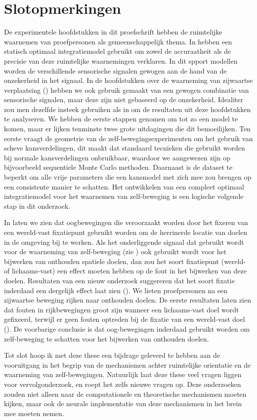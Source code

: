 \section{Slotopmerkingen}
De experimentele hoofdstukken in dit proefschrift hebben de ruimtelijke waarnemen van proefpersonen als gemeenschappelijk thema. In  hebben een statisch optimaal integratiemodel gebruikt om zowel de accuraatheit als de precisie van deze ruimtelijke waarnemingen verklaren. In dit spport modellen worden de verschillende sensorische signalen gewogen aan de hand van de onzekerheid in het signaal. In de hoofdstukken over de waarneming van zijwaartse verplaatsing () hebben we ook gebruik gemaakt van een gewogen combinatie van sensorische signalen, maar deze zijn niet gebaseerd op de onzekerheid. Idealiter zou men dezelfde insteek gebruiken als in  om de resultaten uit deze hoofdstukken te analyseren. We hebben de eerste stappen genomen om tot zo een model te komen, maar er lijken tenminste twee grote uitdagingen die dit bemoeilijken. Ten eerste vraagt de geometrie van de zelf-bewegingsexperimenten om het gebruik van scheve kansverdelingen, dit maakt dat standaard tecnieken die gebruikt worden bij normale kansverdelingen onbruikbaar, waardoor we aangewezen zijn op bijvoorbeeld sequentiele Monte Carlo methoden. Daarnaast is de dataset te beperkt om alle vrije parameters die een kansmodel met zich mee zou brengen op een consistente manier te schatten. Het ontwikkelen van een compleet optimaal integratiemodel voor het waarnemen van zelf-beweging is een logische volgende stap in dit onderzoek.

In  laten we zien dat oogbewegingen die veroorzaakt worden door het fixeren van een wereld-vast fixatiepunt gebruikt worden om de herrinerde locatie van doelen in de omgeving bij te werken. Als het onderliggende signaal dat gebruikt wordt voor de waarneming van zelf-beweging (zie ) ook gebruikt wordt voor het bijwerken van onthouden spatiele doelen, dan zou het soort fixatiepunt (wereld- of lichaams-vast) een effect moeten hebben op de fout in het bijwerken van deze doelen. Resultaten van een nieuw onderzoek suggereren dat het soort fixatie inderdaad een dergelijk effect laat zien (\cite{clemens2010}). We lieten proefpersonen na een zijwaartse beweging rijken naar onthouden doelen. De eerste resultaten laten zien dat fouten in rijkbewegingen groot zijn wanneer een lichaams-vast doel wordt gefixeerd, terwijl er geen fouten optreden bij de fixatie van een wereld-vast doel (\cite{clemens2010}). De voorbarige conclusie is dat oog-bewegingen inderdaad gebruikt worden om zelf-beweging te schatten voor het bijwerken van onthouden doelen.

Tot slot hoop ik met deze these een bijdrage geleverd te hebben aan de vooruitgang in het begrip van de mechanismen achter ruimtelijke orientatie en de waarneming van zelf-bewegingen. Natuurlijk laat deze these veel vragen liggen voor vervolgonderzoek, en roept het zelfs nieuwe vragen op. Deze onderzoeken zouden niet alleen naar de computationele en theoretische mechanismen moeten kijken, maar ook de neurale implementatie van deze mechanismen in het brein mee moeten nemen.

